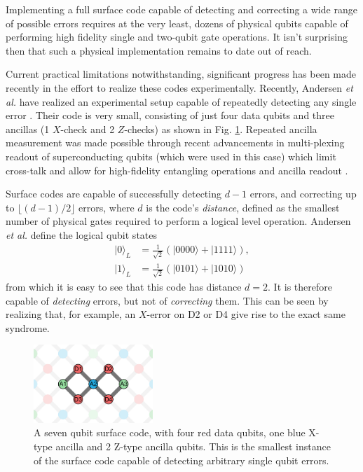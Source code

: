 Implementing a full surface code capable of detecting and correcting a wide
range of possible errors requires at the very least, dozens of physical qubits
capable of performing high fidelity single and two-qubit gate operations. It
isn't surprising then that such a physical implementation remains to date out of
reach. 

Current practical limitations notwithstanding, significant progress has been
made recently in the effort to realize these codes experimentally. Recently,
Andersen \textit{et al.} have realized an experimental setup capable of
repeatedly detecting any single error \cite{Andersen_2020}. Their code is very
small, consisting of just four data qubits and three ancillas (1 $X$-check and 2
$Z$-checks) as shown in Fig. \ref{fig:seven_qbit_code}. Repeated ancilla
measurement was made possible through recent advancements in multi-plexing
readout of superconducting qubits (which were used in this case) which limit
cross-talk and allow for high-fidelity entangling operations and ancilla readout
\cite{barends14_super_quant_circuit_at_surfac} \cite{Bultink_2020}.

Surface codes are capable of successfully detecting $d-1$ errors, and correcting
up to $\lfloor{(d-1)/2} \rfloor$ errors, where $d$ is the code's
\textit{distance}, defined as the smallest number of physical gates required to
perform a logical level operation. Andersen \textit{et al.} define the logical
qubit states
\begin{align}
|0\rangle_L &= \frac{1}{\sqrt{2}} (|0000\rangle + |1111\rangle) , \\
|1\rangle_L &= \frac{1}{\sqrt{2}} (|0101\rangle + |1010\rangle) 
\end{align}
from which it is easy to see that this code has distance $d=2$. It is therefore
capable of \textit{detecting} errors, but not of \textit{correcting} them. This
can be seen by realizing that, for example, an $X$-error on D2 or D4 give rise
to the exact same syndrome.

\begin{figure}
  \centering
  \includegraphics[width=0.4\textwidth]{images/seven_qbit_code.png}
  \caption{A seven qubit surface code, with four red data qubits, one blue
    X-type ancilla and 2 Z-type ancilla qubits. This is the smallest instance of
    the surface code capable of detecting arbitrary single qubit errors.}
  \label{fig:seven_qbit_code}
\end{figure}

